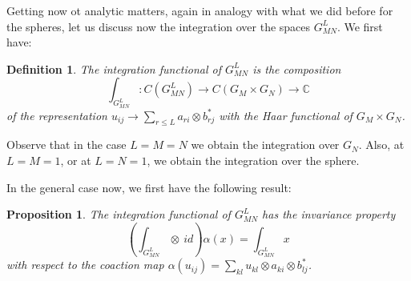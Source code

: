 \documentclass[12pt]{amsbook}
\newtheorem{definition}[theorem]{Definition}
\newtheorem{proposition}[theorem]{Proposition}
\begin{document}
Getting now ot analytic matters, again in analogy with what we did before for the spheres, let us discuss now the integration over the spaces $G_{MN}^L$. We first have:


\begin{definition}
The integration functional of $G_{MN}^L$ is the composition
$$\int_{G_{MN}^L}:C(G_{MN}^L)\to C(G_M\times G_N)\to\mathbb C$$
of the representation $u_{ij}\to\sum_{r\leq L}a_{ri}\otimes b_{rj}^*$ with the Haar functional of $G_M\times G_N$.
\end{definition}

Observe that in the case $L=M=N$ we obtain the integration over $G_N$. Also, at $L=M=1$, or at $L=N=1$, we obtain the integration over the sphere. 

\bigskip

In the general case now, we first have the following result:


\begin{proposition}
The integration functional of $G_{MN}^L$ has the invariance property 
$$\left(\int_{G_{MN}^L}\!\otimes\ id\right)\alpha(x)=\int_{G_{MN}^L}x$$
with respect to the coaction map $\alpha(u_{ij})=\sum_{kl}u_{kl}\otimes a_{ki}\otimes b_{lj}^*$.
\end{proposition}
\end{document}
